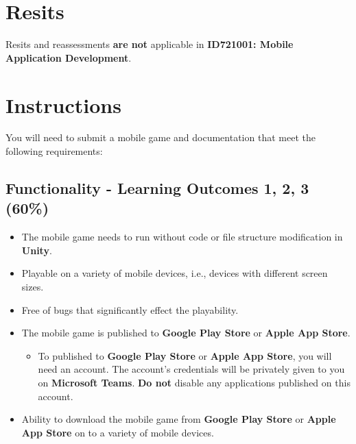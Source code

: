 \documentclass{article}
\begin{document}
\section*{Resits}
Resits and reassessments \textbf{are not} applicable in \textbf{ID721001: Mobile Application Development}.

\section*{Instructions}
You will need to submit a mobile game and documentation that meet the following requirements:

\subsection*{Functionality - Learning Outcomes 1, 2, 3 (60\%)}
\begin{itemize}
	\item The mobile game needs to run without code or file structure modification in \textbf{Unity}.
	\item Playable on a variety of mobile devices, i.e., devices with different screen sizes.
	\item Free of bugs that significantly effect the playability.
	\item The mobile game is published to \textbf{Google Play Store} or \textbf{Apple App Store}.
	      \begin{itemize}
		      \item To published to \textbf{Google Play Store} or \textbf{Apple App Store}, you will need an account. The account's credentials will be privately given to you on \textbf{Microsoft Teams}. \textbf{Do not} disable any applications published on this account.
	      \end{itemize}
	\item Ability to download the mobile game from \textbf{Google Play Store} or \textbf{Apple App Store} on to a variety of mobile devices.
\end{itemize}
\end{document}
